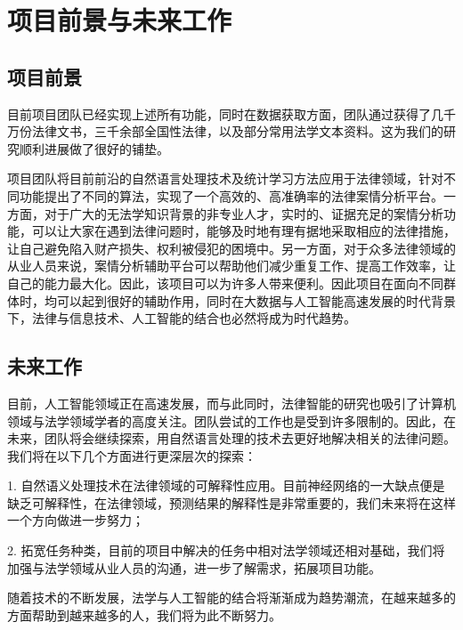 \chapter{项目前景与未来工作}
\label{cha:future_work}

\section{项目前景}
目前项目团队已经实现上述所有功能，同时在数据获取方面，团队通过获得了几千万份法律文书，三千余部全国性法律，以及部分常用法学文本资料。这为我们的研究顺利进展做了很好的铺垫。

项目团队将目前前沿的自然语言处理技术及统计学习方法应用于法律领域，针对不同功能提出了不同的算法，实现了一个高效的、高准确率的法律案情分析平台。一方面，对于广大的无法学知识背景的非专业人才，实时的、证据充足的案情分析功能，可以让大家在遇到法律问题时，能够及时地有理有据地采取相应的法律措施，让自己避免陷入财产损失、权利被侵犯的困境中。另一方面，对于众多法律领域的从业人员来说，案情分析辅助平台可以帮助他们减少重复工作、提高工作效率，让自己的能力最大化。因此，该项目可以为许多人带来便利。因此项目在面向不同群体时，均可以起到很好的辅助作用，同时在大数据与人工智能高速发展的时代背景下，法律与信息技术、人工智能的结合也必然将成为时代趋势。


\section{未来工作}

目前，人工智能领域正在高速发展，而与此同时，法律智能的研究也吸引了计算机领域与法学领域学者的高度关注。团队尝试的工作也是受到许多限制的。因此，在未来，团队将会继续探索，用自然语言处理的技术去更好地解决相关的法律问题。
	我们将在以下几个方面进行更深层次的探索：
	
1.	自然语义处理技术在法律领域的可解释性应用。目前神经网络的一大缺点便是缺乏可解释性，在法律领域，预测结果的解释性是非常重要的，我们未来将在这样一个方向做进一步努力；

2.	拓宽任务种类，目前的项目中解决的任务中相对法学领域还相对基础，我们将加强与法学领域从业人员的沟通，进一步了解需求，拓展项目功能。

随着技术的不断发展，法学与人工智能的结合将渐渐成为趋势潮流，在越来越多的方面帮助到越来越多的人，我们将为此不断努力。

